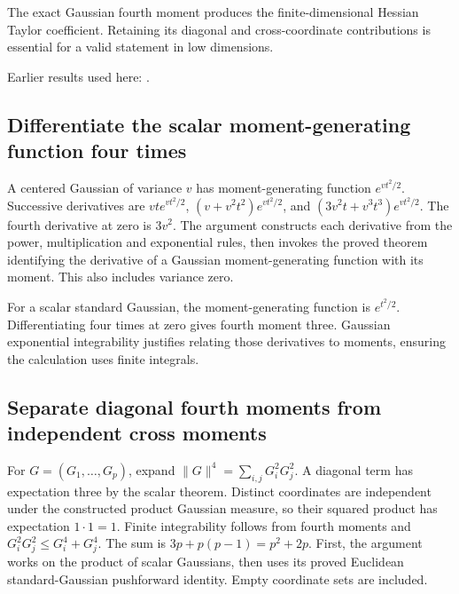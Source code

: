\documentclass[11pt,a4paper]{report}
\begin{document}
The exact Gaussian fourth moment produces the finite-dimensional Hessian Taylor coefficient. Retaining its diagonal and cross-coordinate contributions is essential for a valid statement in low dimensions.



Earlier results used here: \cite[Section~3.4]{LangevinLean2026ULASC}.
\subsection{\texorpdfstring{Differentiate the scalar moment-generating function four times}{Differentiate the scalar moment-generating function four times}}
\label{report-step-KineticLangevin-GaussianFourth-lean-1}


A centered Gaussian of variance \(v\) has moment-generating function \(e^{vt^2/2}\). Successive derivatives are \(vt e^{vt^2/2}\), \((v+v^2t^2)e^{vt^2/2}\), and \((3v^2t+v^3t^3)e^{vt^2/2}\). The fourth derivative at zero is \(3v^2\). The argument constructs each derivative from the power, multiplication and exponential rules, then invokes the proved theorem identifying the derivative of a Gaussian moment-generating function with its moment. This also includes variance zero.



For a scalar standard Gaussian, the moment-generating function is \(e^{t^2/2}\). Differentiating four times at zero gives fourth moment three. Gaussian exponential integrability justifies relating those derivatives to moments, ensuring the calculation uses finite integrals.

\subsection{\texorpdfstring{Separate diagonal fourth moments from independent cross moments}{Separate diagonal fourth moments from independent cross moments}}
\label{report-step-KineticLangevin-GaussianFourth-lean-2}


For \(G=(G_1,\ldots,G_p)\), expand \(\lVert G\rVert^4=\sum_{i,j}G_i^2G_j^2\). A diagonal term has expectation three by the scalar theorem. Distinct coordinates are independent under the constructed product Gaussian measure, so their squared product has expectation \(1\cdot1=1\). Finite integrability follows from fourth moments and \(G_i^2G_j^2\le G_i^4+G_j^4\). The sum is \(3p+p(p-1)=p^2+2p\). First, the argument works on the product of scalar Gaussians, then uses its proved Euclidean standard-Gaussian pushforward identity. Empty coordinate sets are included.
\end{document}
